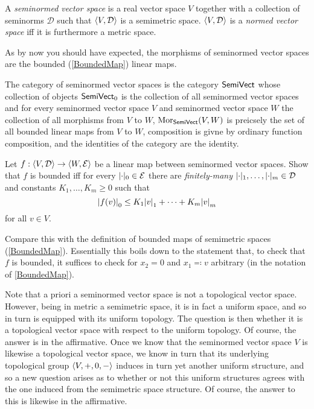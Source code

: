 \begin{dfn}\label{SeminormedVectorSpace}
A \emph{seminormed vector space} is a real vector space $V$ together with a collection of seminorms $\mathcal{D}$ such that $\langle V,\mathcal{D}\rangle$ is a semimetric space.  $\langle V,\mathcal{D}\rangle$ is a \emph{normed vector space} iff it is furthermore a metric space.
\end{dfn}
As by now you should have expected, the morphisms of seminormed vector spaces are the bounded (\cref{BoundedMap}) linear maps.
\begin{exm}
The category of seminormed vector spaces is the category $\mathsf{Semi} \mathsf{Vect}$ whose collection of objects $\mathsf{Semi} \mathsf{Vect} _0$ is the collection of all seminormed vector spaces and for every seminormed vector space $V$ and seminormed vector space $W$ the collection of all morphisms from $V$ to $W$, $\operatorname{Mor} _{\mathsf{Semi} \mathsf{Vect}}(V,W)$ is preicsely the set of all bounded linear maps from $V$ to $W$, composition is givne by ordinary function composition, and the identities of the category are the identity.
\end{exm}
\begin{exr}
Let $f:\langle V,\mathcal{D}\rangle\rightarrow \langle W,\mathcal{E}\rangle$ be a linear map between seminormed vector spaces.  Show that $f$ is bounded iff for every $\norm _0\in \mathcal{E}$ there are \emph{finitely-many} $\norm _1,\ldots ,\norm _m\in \mathcal{D}$ and constants $K_1,\ldots ,K_m\geq 0$ such that
\begin{equation}
\norm[f(v)]_0\leq K_1\norm[v]_1+\cdots +K_m\norm[v]_m
\end{equation}
for all $v\in V$.
\begin{rmk}
Compare this with the definition of bounded maps of semimetric spaces (\cref{BoundedMap}).  Essentially this boils down to the statement that, to check that $f$ is bounded, it suffices to check for $x_2=0$ and $x_1\eqqcolon v$ arbitrary (in the notation of \cref{BoundedMap}).
\end{rmk}
\end{exr}
Note that a priori a seminormed vector space is not a topological vector space.  However, being in metric a semimetric space, it is in fact a uniform space, and so in turn is equipped with its uniform topology.  The question is then whether it is a topological vector space with respect to the uniform topology.  Of course, the answer is in the affirmative.  Once we know that the seminormed vector space $V$ is likewise a topological vector space, we know in turn that its underlying topological group $\langle V,+,0,-\rangle$ induces in turn yet another uniform structure, and so a new question arises as to whether or not this uniform structures agrees with the one induced from the semimetric space structure.  Of course, the answer to this is likewise in the affirmative.
